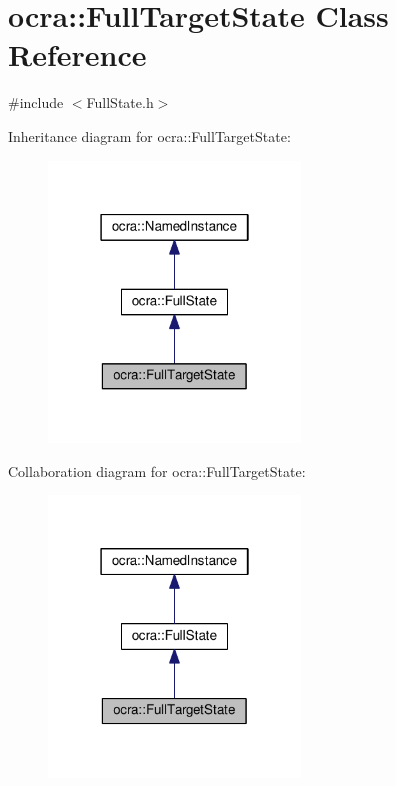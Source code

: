 \hypertarget{classocra_1_1FullTargetState}{}\section{ocra\+:\+:Full\+Target\+State Class Reference}
\label{classocra_1_1FullTargetState}


{\ttfamily \#include $<$Full\+State.\+h$>$}



Inheritance diagram for ocra\+:\+:Full\+Target\+State\+:
\nopagebreak
\begin{figure}[H]
\begin{center}
\leavevmode
\includegraphics[width=190pt]{d7/d42/classocra_1_1FullTargetState__inherit__graph}
\end{center}
\end{figure}


Collaboration diagram for ocra\+:\+:Full\+Target\+State\+:
\nopagebreak
\begin{figure}[H]
\begin{center}
\leavevmode
\includegraphics[width=190pt]{de/df8/classocra_1_1FullTargetState__coll__graph}
\end{center}
\end{figure}
